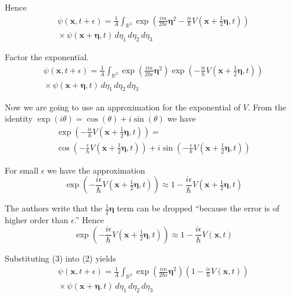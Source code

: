 \documentclass[12pt]{article}
\begin{document}
Hence
\begin{multline*}
\psi(\mathbf{x},t+\epsilon)=
\frac{1}{A}\int_{\mathbb R^3}
\exp\left(
\frac{im}{2\hbar\epsilon}\boldsymbol\eta^2
-\frac{i\epsilon}{\hbar} V\left(\mathbf x+\tfrac{1}{2}\boldsymbol\eta,t\right)
\right)
\\
{}\times\psi(\mathbf{x}+\boldsymbol\eta,t)\,d\eta_1\,d\eta_2\,d\eta_3
\end{multline*}

Factor the exponential.
\begin{multline*}
\psi(\mathbf{x},t+\epsilon)=
\frac{1}{A}\int_{\mathbb R^3}
\exp\left(\frac{im}{2\hbar\epsilon}\boldsymbol\eta^2\right)
\exp\left(-\frac{i\epsilon}{\hbar}V\left(\mathbf x+\tfrac{1}{2}\boldsymbol\eta,t\right)\right)
\\
{}\times\psi(\mathbf{x}+\boldsymbol\eta,t)\,d\eta_1\,d\eta_2\,d\eta_3
\tag{2}
\end{multline*}

Now we are going to use an approximation for the exponential of $V$.
From the identity $\exp(i\theta)=\cos(\theta)+i\sin(\theta)$ we have
\begin{multline*}
\exp\left(-\frac{i\epsilon}{\hbar}V\left(\mathbf x+\tfrac{1}{2}\boldsymbol\eta,t\right)\right)=
\\
\cos\left(-\frac{\epsilon}{\hbar}V\left(\mathbf x+\tfrac{1}{2}\boldsymbol\eta,t\right)\right)
+i\sin\left(-\frac{\epsilon}{\hbar}V\left(\mathbf x+\tfrac{1}{2}\boldsymbol\eta,t\right)\right)
\end{multline*}

For small $\epsilon$ we have the approximation
\begin{equation*}
\exp\left(-\frac{i\epsilon}{\hbar}V\left(\mathbf x+\tfrac{1}{2}\boldsymbol\eta,t\right)\right)\approx
1-\frac{i\epsilon}{\hbar}V\left(\mathbf x+\tfrac{1}{2}\boldsymbol\eta,t\right)
\end{equation*}

The authors write that the $\tfrac{1}{2}\boldsymbol\eta$ term can be dropped
``because the error is of higher order than $\epsilon$.''
Hence
\begin{equation*}
\exp\left(-\frac{i\epsilon}{\hbar}V\left(\mathbf x+\tfrac{1}{2}\boldsymbol\eta,t\right)\right)\approx
1-\frac{i\epsilon}{\hbar}V\left(\mathbf x,t\right)
\tag{3}
\end{equation*}

Substituting (3) into (2) yields
\begin{multline*}
\psi(\mathbf{x},t+\epsilon)=
\frac{1}{A}\int_{\mathbb R^3}
\exp\left(\frac{im}{2\hbar\epsilon}\boldsymbol\eta^2\right)
\left(1-\frac{i\epsilon}{\hbar}V\left(\mathbf x,t\right)\right)
\\
{}\times\psi(\mathbf x+\boldsymbol\eta,t)\,d\eta_1\,d\eta_2\,d\eta_3
\tag{4}
\end{multline*}
\end{document}
